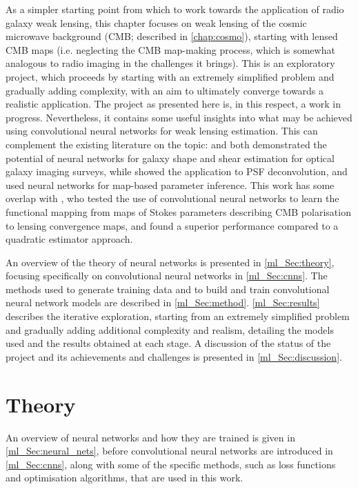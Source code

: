 As a simpler starting point from which to work towards the application of radio galaxy weak lensing, this chapter focuses on weak lensing of the cosmic microwave background (CMB; described in \autoref{chap:cosmo}), starting with lensed CMB maps (i.e. neglecting the CMB map-making process, which is somewhat analogous to radio imaging in the challenges it brings). This is an exploratory project, which proceeds by starting with an extremely simplified problem and gradually adding complexity, with an aim to ultimately converge towards a realistic application. The project as presented here is, in this respect, a work in progress. Nevertheless, it contains some useful insights into what may be achieved using convolutional neural networks for weak lensing estimation. This can complement the existing literature on the topic: \citet{Ribli2019a} and \citet{Tewes2019} both demonstrated the potential of neural networks for galaxy shape and shear estimation for optical galaxy imaging surveys, while \citet{Nurbaeva2015} showed the application to PSF deconvolution, and \citet{Ribli2019b} used neural networks for map-based parameter inference. This work has some overlap with \citet{Caldeira2019}, who tested the use of convolutional neural networks to learn the functional mapping from maps of Stokes parameters describing CMB polarisation to lensing convergence maps, and found a superior performance compared to a quadratic estimator approach.

An overview of the theory of neural networks is presented in \autoref{ml_Sec:theory}, focusing specifically on convolutional neural networks in \autoref{ml_Sec:cnns}. The methods used to generate training data and to build and train convolutional neural network models are described in \autoref{ml_Sec:method}. \autoref{ml_Sec:results} describes the iterative exploration, starting from an extremely simplified problem and gradually adding additional complexity and realism, detailing the models used and the results obtained at each stage. A discussion of the status of the project and its achievements and challenges is presented in \autoref{ml_Sec:discussion}.

\section{Theory}
\label{ml_Sec:theory}

An overview of neural networks and how they are trained is given in \autoref{ml_Sec:neural_nets}, before convolutional neural networks are introduced in \autoref{ml_Sec:cnns}, along with some of the specific methods, such as loss functions and optimisation algorithms, that are used in this work.

